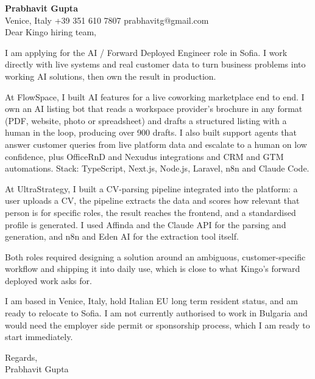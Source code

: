 \documentclass[a4paper,10.5pt]{article}
\begin{document}
\textbf{Prabhavit Gupta}\\
Venice, Italy \textbar{} +39 351 610 7807 \textbar{} prabhavitg@gmail.com\\[10pt]
Dear Kingo hiring team,

I am applying for the AI / Forward Deployed Engineer role in Sofia. I work directly with live systems and real customer data to turn business problems into working AI solutions, then own the result in production.

At FlowSpace, I built AI features for a live coworking marketplace end to end. I own an AI listing bot that reads a workspace provider's brochure in any format (PDF, website, photo or spreadsheet) and drafts a structured listing with a human in the loop, producing over 900 drafts. I also built support agents that answer customer queries from live platform data and escalate to a human on low confidence, plus OfficeRnD and Nexudus integrations and CRM and GTM automations. Stack: TypeScript, Next.js, Node.js, Laravel, n8n and Claude Code.

At UltraStrategy, I built a CV-parsing pipeline integrated into the platform: a user uploads a CV, the pipeline extracts the data and scores how relevant that person is for specific roles, the result reaches the frontend, and a standardised profile is generated. I used Affinda and the Claude API for the parsing and generation, and n8n and Eden AI for the extraction tool itself.

Both roles required designing a solution around an ambiguous, customer-specific workflow and shipping it into daily use, which is close to what Kingo's forward deployed work asks for.

I am based in Venice, Italy, hold Italian EU long term resident status, and am ready to relocate to Sofia. I am not currently authorised to work in Bulgaria and would need the employer side permit or sponsorship process, which I am ready to start immediately.

Regards,\\
Prabhavit Gupta
\end{document}
